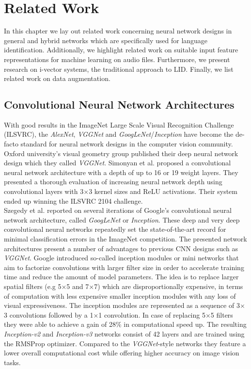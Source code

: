 \section{Related Work}
\label{sec:related_work}
In this chapter we lay out related work concerning neural network designs in general and hybrid networks which are specifically used for language identification. Additionally, we highlight related work on suitable input feature representations for machine learning on audio files. Furthermore, we present research on i-vector systems, the traditional approach to LID. Finally, we list related work on data augmentation. 

\subsection{Convolutional Neural Network Architectures}
With good results in the ImageNet Large Scale Visual Recognition Challenge (ILSVRC)\cite{ILSVRC15}, the \emph{AlexNet}\cite{krizhevsky2012imagenet}, \emph{VGGNet}\cite{simonyan2014very} and \emph{GoogLeNet}/\emph{Inception}\cite{szegedy2015going} have become the de-facto standard for neural network designs in the computer vision community.\\ 
Oxford university's visual geometry group published their deep neural network design which they called \emph{VGGNet}. Simonyan et al. proposed a convolutional neural network architecture with a depth of up to 16 or 19 weight layers.\cite{simonyan2014very, Chatfield14} They presented a thorough evaluation of increasing neural network depth using convolutional layers with 3$\times$3 kernel sizes and ReLU activations. Their system ended up winning the ILSVRC 2104 challenge.\\
Szegedy et al. reported on several iterations of Google's convolutional neural network architecture, called \emph{GoogLeNet} or \emph{Inception}.\cite{szegedy2015going, szegedy2016rethinking, szegedy2016inception} These deep and very deep convolutional neural networks repeatedly set the state-of-the-art record for minimal classification errors in the ImageNet competition. The presented network architectures present a number of advantages to previous CNN designs such as \emph{VGGNet}. Google introduced so-called inception modules or mini networks that aim to factorize convolutions with larger filter size in order to accelerate training time and reduce the amount of model parameters. The idea is to replace larger spatial filters (e.g 5$\times$5 and 7$\times$7) which are disproportionally expensive, in terms of computation with less expensive smaller inception modules with any loss of visual expressiveness. The inception modules are represented as a sequence of 3$\times$3 convolutions followed by a 1$\times$1 convolution. In case of replacing 5$\times$5 filters they were able to achieve a gain of 28\% in computational speed up. The resulting \emph{Inception-v2} and \emph{Inception-v3} networks consist of 42 layers and are trained using the RMSProp\cite{tieleman2012lecture} optimizer. Compared to the \emph{VGGNet}-style networks they feature a lower overall computational cost while offering higher accuracy on image vision tasks.

